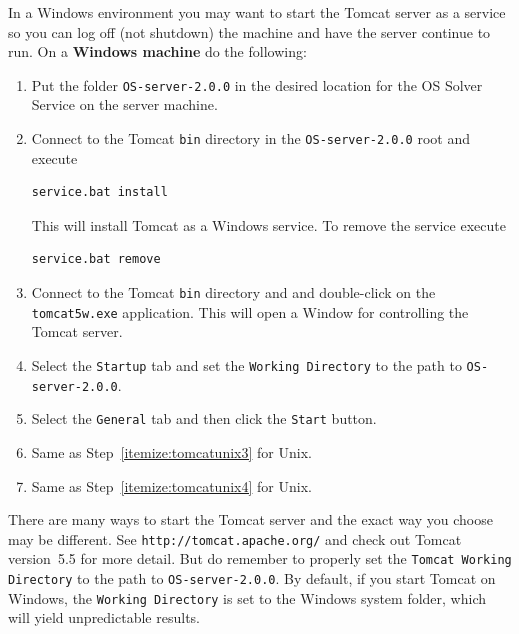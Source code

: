 \documentclass[11pt]{article}
\renewcommand{\_}{{\char"5F}}
\renewcommand{\{}{{\char"7B}}
\renewcommand{\}}{{\char"7D}}
\renewcommand{\^}{{\char"0D}}
\renewcommand{\'}{{\char"0D}}
\newcommand{\UrlTomcat}{http://tomcat.apache.org/}
\begin{document}
\begin{enumerate}[Step 1:]
In a Windows environment you may want to start the Tomcat server as a service so you can log off (not shutdown)
the machine and have the server continue to run. On a {\bf Windows machine} do the following:

\begin{enumerate}[Step 1.]

\item{}  Put the folder  {\tt OS-server-2.0.0}   in the desired location for the OS Solver Service on the server machine.

\item{} \label{itemize:tomcatwin2}  Connect to the Tomcat {\tt bin} directory in the {\tt OS-server-2.0.0} root and execute
\begin{verbatim}
service.bat install
\end{verbatim}
This will install Tomcat as a Windows service.  To remove the service execute
\begin{verbatim}
service.bat remove
\end{verbatim}

\item{}  \label{itemize:tomcatwin3}  Connect to the Tomcat {\tt bin} directory and and double-click on the
{\tt tomcat5w.exe} application.  This will open a Window for controlling the Tomcat server.

\item{}  \label{itemize:tomcatwin4} Select the {\tt Startup} tab and set the {\tt Working Directory}
to the path to {\tt OS-server-2.0.0}.

\item{}  \label{itemize:tomcatwin5} Select the {\tt General} tab and then click the {\tt Start} button.

\item{}  Same as Step~\ref{itemize:tomcatunix3} for Unix.

\item{}  Same as Step~\ref{itemize:tomcatunix4} for Unix.

\end{enumerate}

\vskip 8pt

There are many ways to start the Tomcat server and the exact way you choose may be different.
See {\tt\UrlTomcat} and check out Tomcat version~5.5 for more detail. But do remember to
properly set the {\tt Tomcat Working Directory} to the path to {\tt OS-server-2.0.0}. By default,
if you start Tomcat on Windows, the {\tt Working Directory} is set to the Windows system folder,
which will yield unpredictable results.


\end{enumerate}
\end{document}
